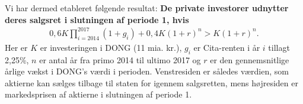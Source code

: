 \documentclass{article}
\begin{document}





Vi har dermed etableret følgende resultat: \textbf{De private investorer udnytter deres salgsret i slutningen af periode 1, hvis } 
\begin{align}
0{,}6K\prod_{i=2014}^{2017}(1+g_i)+0{,}4K(1+r)^n>K(1+r)^n.\label{eq:opt_con}
\end{align}
Her er $K$ er investeringen i DONG (11 mia. kr.), $g_i$ er Cita-renten i år $i$ tillagt 2,25\%, $n$ er antal år fra primo 2014 til ultimo 2017 og $r$ er den gennemsnitlige årlige vækst i DONG's værdi i perioden. Venstresiden er således værdien, som aktierne kan sælges tilbage til staten for igennem salgsretten, mens højresiden er markedsprisen af aktierne i slutningen af periode 1.
\end{document}
